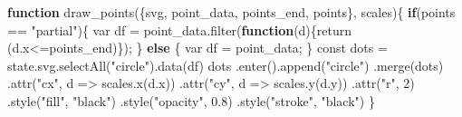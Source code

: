 \documentclass[print]{nuthesis}
\newenvironment{Shaded}{\begin{snugshade}}{\end{snugshade}}
\newcommand{\AttributeTok}[1]{\textcolor[rgb]{0.77,0.63,0.00}{#1}}
\newcommand{\ControlFlowTok}[1]{\textcolor[rgb]{0.13,0.29,0.53}{\textbf{#1}}}
\newcommand{\DecValTok}[1]{\textcolor[rgb]{0.00,0.00,0.81}{#1}}
\newcommand{\FloatTok}[1]{\textcolor[rgb]{0.00,0.00,0.81}{#1}}
\newcommand{\FunctionTok}[1]{\textcolor[rgb]{0.00,0.00,0.00}{#1}}
\newcommand{\NormalTok}[1]{#1}
\newcommand{\OtherTok}[1]{\textcolor[rgb]{0.56,0.35,0.01}{#1}}
\newcommand{\SpecialCharTok}[1]{\textcolor[rgb]{0.00,0.00,0.00}{#1}}
\newcommand{\StringTok}[1]{\textcolor[rgb]{0.31,0.60,0.02}{#1}}
\begin{document}
\begin{Shaded}
\begin{Highlighting}[]
\ControlFlowTok{function} \FunctionTok{draw\_points}\NormalTok{(\{svg, point\_data, points\_end, points\}, scales)\{}
    \ControlFlowTok{if}\NormalTok{(points }\SpecialCharTok{==} \StringTok{"partial"}\NormalTok{)\{}
\NormalTok{      var df }\OtherTok{=} \FunctionTok{point\_data.filter}\NormalTok{(}\ControlFlowTok{function}\NormalTok{(d)\{}\FunctionTok{return}\NormalTok{ (d.x}\SpecialCharTok{\textless{}=}\NormalTok{points\_end)\});}
\NormalTok{    \} }\ControlFlowTok{else}\NormalTok{ \{}
\NormalTok{      var df }\OtherTok{=}\NormalTok{ point\_data;}
\NormalTok{    \}}
\NormalTok{  const dots }\OtherTok{=} \FunctionTok{state.svg.selectAll}\NormalTok{(}\StringTok{"circle"}\NormalTok{)}\FunctionTok{.data}\NormalTok{(df)}
\NormalTok{  dots}
    \FunctionTok{.enter}\NormalTok{()}\FunctionTok{.append}\NormalTok{(}\StringTok{"circle"}\NormalTok{)}
    \FunctionTok{.merge}\NormalTok{(dots)}
    \FunctionTok{.attr}\NormalTok{(}\StringTok{"cx"}\NormalTok{, }\AttributeTok{d =}\SpecialCharTok{\textgreater{}} \FunctionTok{scales.x}\NormalTok{(d.x))}
    \FunctionTok{.attr}\NormalTok{(}\StringTok{"cy"}\NormalTok{, }\AttributeTok{d =}\SpecialCharTok{\textgreater{}} \FunctionTok{scales.y}\NormalTok{(d.y))}
    \FunctionTok{.attr}\NormalTok{(}\StringTok{"r"}\NormalTok{, }\DecValTok{2}\NormalTok{)}
    \FunctionTok{.style}\NormalTok{(}\StringTok{"fill"}\NormalTok{, }\StringTok{"black"}\NormalTok{)}
    \FunctionTok{.style}\NormalTok{(}\StringTok{"opacity"}\NormalTok{, }\FloatTok{0.8}\NormalTok{)}
    \FunctionTok{.style}\NormalTok{(}\StringTok{"stroke"}\NormalTok{, }\StringTok{"black"}\NormalTok{)}
\NormalTok{\}}


\end{Highlighting}
\end{Shaded}
\end{document}
